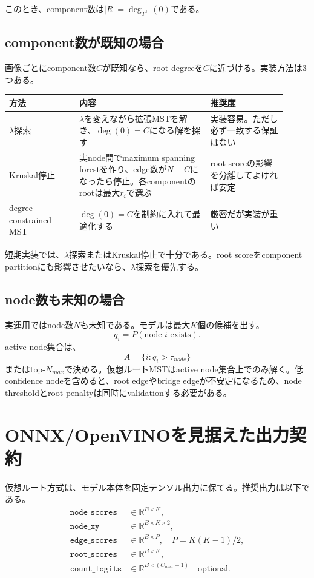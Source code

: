 \documentclass[11pt,a4paper]{article}
\newcommand{\R}{\mathbb{R}}
\begin{document}
このとき、component数は$|R|=\deg_{T^+}(0)$である。

\subsection{component数が既知の場合}
画像ごとにcomponent数$C$が既知なら、root degreeを$C$に近づける。実装方法は3つある。

\begin{longtable}{p{0.23\linewidth}p{0.43\linewidth}p{0.25\linewidth}}
\toprule
方法 & 内容 & 推奨度 \\
\midrule
$\lambda$探索 & $\lambda$を変えながら拡張MSTを解き、$\deg(0)=C$になる解を探す & 実装容易。ただし必ず一致する保証はない \\
Kruskal停止 & 実node間でmaximum spanning forestを作り、edge数が$N-C$になったら停止。各componentのrootは最大$r_i$で選ぶ & root scoreの影響を分離してよければ安定 \\
degree-constrained MST & $\deg(0)=C$を制約に入れて最適化する & 厳密だが実装が重い \\
\bottomrule
\end{longtable}

短期実装では、$\lambda$探索またはKruskal停止で十分である。root scoreをcomponent partitionにも影響させたいなら、$\lambda$探索を優先する。

\subsection{node数も未知の場合}
実運用ではnode数$N$も未知である。モデルは最大$K$個の候補を出す。
\begin{equation}
  q_i=P(\text{node }i\text{ exists}).
\end{equation}
active node集合は、
\begin{equation}
  A=\{i:q_i>\tau_{node}\}
\end{equation}
またはtop-$N_{max}$で決める。仮想ルートMSTはactive node集合上でのみ解く。低confidence nodeを含めると、root edgeやbridge edgeが不安定になるため、node thresholdとroot penaltyは同時にvalidationする必要がある。

\section{ONNX/OpenVINOを見据えた出力契約}
仮想ルート方式は、モデル本体を固定テンソル出力に保てる。推奨出力は以下である。
\begin{align}
  \texttt{node\_scores} &\in \R^{B\times K}, \\
  \texttt{node\_xy}     &\in \R^{B\times K\times 2}, \\
  \texttt{edge\_scores} &\in \R^{B\times P}, \quad P=K(K-1)/2, \\
  \texttt{root\_scores} &\in \R^{B\times K}, \\
  \texttt{count\_logits}&\in \R^{B\times(C_{max}+1)}\quad\text{optional}.
\end{align}
\end{document}
